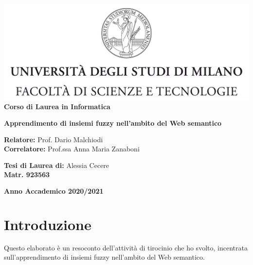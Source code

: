 \documentclass[12pt,a4paper]{report}
\begin{document}
\begin{titlepage}
\begin{center}
\includegraphics[width=\textwidth]{Logo.jpg}\\
{\large{\bf Corso di Laurea in Informatica}}
\end{center}
\vspace{12mm}
\begin{center}
{\huge{\bf Apprendimento di insiemi fuzzy nell'ambito del Web semantico}}\\
\end{center}
\vspace{12mm}
\begin{flushleft}
{\large{\bf Relatore:}}
{\large{Prof. Dario Malchiodi}}\\
\vspace{4mm}
{\large{\bf Correlatore:}}
{\large{Prof.ssa Anna Maria Zanaboni}}\\
\end{flushleft}
\vspace{12mm}
\begin{flushright}
{\large{\bf Tesi di Laurea di:}}
{\large{Alessia Cecere}}\\
{\large{\bf Matr. 923563}}\\
\end{flushright}
\vspace{4mm}
\begin{center}
{\large{\bf Anno Accademico 2020/2021}}
\end{center}
\end{titlepage}


\tableofcontents


\chapter*{Introduzione}
Questo elaborato è un resoconto dell'attività di tirocinio che ho svolto, incentrata sull'apprendimento di insiemi fuzzy nell'ambito del Web semantico. 
\end{document}
